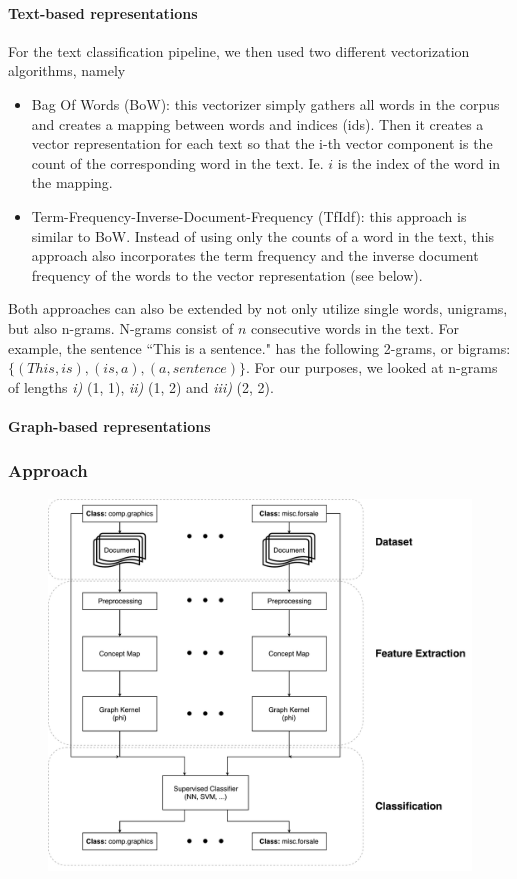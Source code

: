 \paragraph{Text-based representations}
For the text classification pipeline, we then used two different vectorization algorithms, namely
\begin{itemize}
\item{Bag Of Words (BoW): this vectorizer simply gathers all words in the corpus and creates a mapping between words and indices (ids). Then it creates a vector representation for each text so that the i-th vector component  is the count of the corresponding word in the text. Ie. $i$ is the index of the word in the mapping.}
\item{Term-Frequency-Inverse-Document-Frequency (TfIdf): this approach is similar to BoW. Instead of using only the counts of a word in the text, this approach also incorporates the term frequency and the inverse document frequency of the words to the vector representation (see below).}
\end{itemize}
Both approaches can also be extended by not only utilize single words, unigrams, but also n-grams. N-grams consist of $n$ consecutive words in the text.
For example, the sentence ``This is a sentence." has the following 2-grams, or bigrams: $\{ (This, is), (is, a), (a, sentence) \}$.
For our purposes, we looked at n-grams of lengths \textit{i)} (1, 1), \textit{ii)} (1, 2) and \textit{iii)} (2, 2).


\paragraph{Graph-based representations}


\subsubsection{Approach}

\begin{figure}[ht]
\centering\includegraphics[width=0.6\linewidth]{assets/figures/approach.pdf}
\caption{}
\end{figure}

